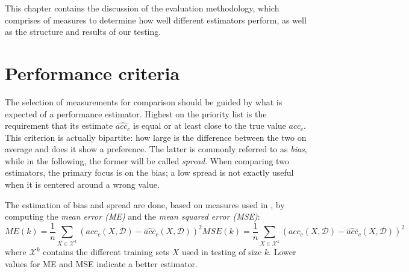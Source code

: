 \label{evaluation}

This chapter contains the discussion of the evaluation methodology, which comprises of measures to determine how well different estimators perform, as well as the structure and results of our testing.

\section{Performance criteria}
\label{evaluation:objective}

The selection of measurements for comparison should be guided by what is expected of a performance estimator. Highest on the priority list is the requirement that its estimate $\widehat{acc_c}$ is equal or at least close to the true value $acc_c$. This criterion is actually bipartite: how large is the difference between the two on average and does it show a preference. The latter is commonly referred to as \textit{bias}, while in the following, the former will be called \textit{spread}. When comparing two estimators, the primary focus is on the bias; a low spread is not exactly useful when it is centered around a wrong value.

The estimation of bias and spread are done, based on measures used in \cite{FigueroaEtal2012}, by computing the \textit{mean error (ME)} and the \textit{mean squared error (MSE)}:
\begin{subequations}
\begin{equation}
ME(k) = \frac{1}{n} \sum_{X \in \mathcal{X}^k}^{} \left(acc_c(X,\mathcal{D}) - \widehat{acc}_c(X,\mathcal{D})\right)^2
\end{equation}
\begin{equation}
MSE(k) = \frac{1}{n} \sum_{X \in \mathcal{X}^k}^{} \left(acc_c(X,\mathcal{D}) - \widehat{acc}_c(X,\mathcal{D})\right)^2
\end{equation}
\end{subequations}
where $\mathcal{X}^k$ contains the different training sets $X$ used in testing of size $k$. Lower values for ME and MSE indicate a better estimator.

